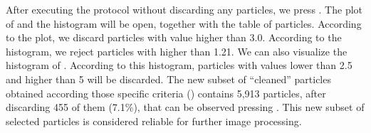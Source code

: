  After executing the protocol without discarding any particles, we press . The plot of  and the  histogram will be open, together with the table of particles. According to the  plot, we discard particles with  value higher than 3.0. According to the  histogram, we reject particles with  higher than 1.21. We can also visualize the histogram of . According to this histogram, particles with  values lower than 2.5 and higher than 5 will be discarded. The new subset of ``cleaned'' particles  obtained according those specific criteria () contains 5,913 particles, after discarding 455 of them (7.1\%), that can be observed pressing . This new subset of selected particles is considered reliable for further image processing.
